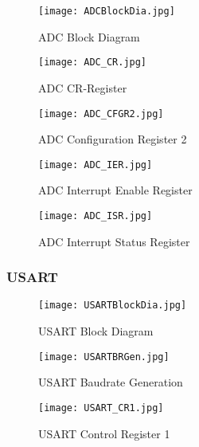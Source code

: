 \begin{figure}[hbt!]
	\texttt{[image: ADCBlockDia.jpg]}
	\caption{ADC Block Diagram}
	\label{fig:ADCBlockDia}
\end{figure}

\begin{figure}[hbt!]
	\texttt{[image: ADC\_CR.jpg]}
	\caption{ADC CR-Register}
	\label{fig:ADC_CR}
\end{figure}

\pagebreak

\begin{figure}[hbt!]
	\texttt{[image: ADC\_CFGR2.jpg]}
	\caption{ADC Configuration Register 2}
	\label{fig:ADC_CFGR2}
\end{figure}

\begin{figure}[hbt!]
	\texttt{[image: ADC\_IER.jpg]}
	\caption{ADC Interrupt Enable Register}
	\label{fig:ADC_IER}
\end{figure}

\begin{figure}[hbt!]
	\texttt{[image: ADC\_ISR.jpg]}
	\caption{ADC Interrupt Status Register}
	\label{fig:ADC_ISR}
\end{figure}

\pagebreak

\subsubsection{USART}
\label{subsec:UsartReg}

\begin{figure}[hbt!]
	\texttt{[image: USARTBlockDia.jpg]}
	\caption{USART Block Diagram}
	\label{fig:USARTBlockDia}
\end{figure}

\pagebreak

\begin{figure}[hbt!]
	\texttt{[image: USARTBRGen.jpg]}
	\caption{USART Baudrate Generation}
	\label{fig:USARTBRGen}
\end{figure}

\begin{figure}[hbt!]
	\texttt{[image: USART\_CR1.jpg]}
	\caption{USART Control Register 1}
	\label{fig:USART_CR1}
\end{figure}


